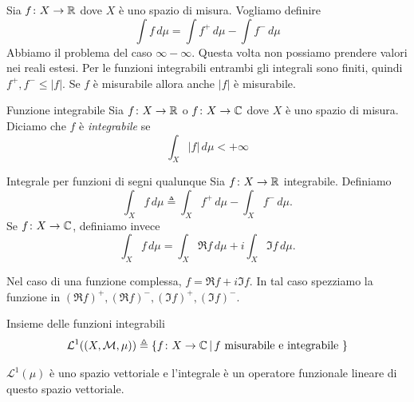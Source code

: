 \documentclass[a4paper]{article}
\begin{document}
\begin{radioactive}
Sia \(f \colon X \to \mathbb{R}\)
dove \(X\) è uno spazio di misura. Vogliamo definire
\[
    \int f \,d\mu
    = \int f^+ \,d\mu
    - \int f^- \,d\mu
\]
Abbiamo il problema del caso \(\infty - \infty\).
Questa volta non possiamo prendere valori nei reali estesi.
Per le funzioni integrabili entrambi gli integrali sono finiti,
quindi \(f^+, f^- \leq |f|\). Se \(f\) è misurabile
allora anche \(|f|\) è misurabile.
\end{radioactive}

\begin{radioactive}
\begin{snippetdefinition}{Funzione integrabile}
    Sia \(f \colon X \to \mathbb{R}\)
    o \(f \colon X \to \mathbb{C}\)
    dove \(X\) è uno spazio di misura.
    Diciamo che \(f\) è \emph{integrabile}
    se \[
        \int_X |f|\,d\mu < +\infty
    \]
\end{snippetdefinition}
\end{radioactive}

\begin{radioactive}
\begin{snippetdefinition}{Integrale per funzioni di segni qualunque}
    Sia \(f\colon X\to\mathbb{R}\) integrabile. Definiamo
    \[
        \int_X f\,d\mu
        \triangleq\int_Xf^+\,d\mu-\int_Xf^-\,d\mu.
    \]
    Se \(f\colon X\to\mathbb{C}\), definiamo invece
    \[
        \int_Xf\,d\mu=\int_X\Re f\,d\mu+i\int_X\Im f\,d\mu.
    \]
\end{snippetdefinition}
\end{radioactive}

\begin{radioactive}
Nel caso di una funzione complessa, \(f = \Re f + i \Im f\).
In tal caso spezziamo la funzione
in \((\Re f)^+,(\Re f)^-,(\Im f)^+,(\Im f)^-\).
\end{radioactive}

\begin{radioactive}
\begin{snippetdefinition}{Insieme delle funzioni integrabili}
    \[
        \mathcal L^1((X, \mathcal M, \mu))
        \triangleq \{
            f \colon X \to \mathbb{C}
            \,|\, f \text { misurabile e integrabile }
        \}
    \]
\end{snippetdefinition}
\end{radioactive}

\begin{radioactive}
\begin{snippettheorem}{}
    \(\mathcal L^1(\mu)\) è uno spazio vettoriale e l'integrale è un operatore
    funzionale lineare di questo spazio vettoriale.
\end{snippettheorem}
\end{radioactive}
\end{document}
